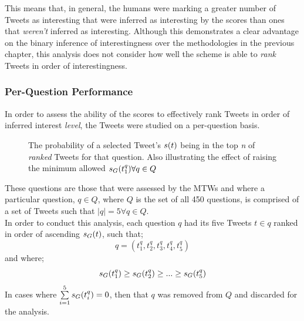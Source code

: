 This means that, in general, the humans were marking a greater number of Tweets as interesting that were inferred as interesting by the scores than ones that \textit{weren't} inferred as interesting. Although this demonstrates a clear advantage on the binary inference of interestingness over the methodologies in the previous chapter, this analysis does not consider how well the scheme is able to \textit{rank} Tweets in order of interestingness.


\subsubsection{Per-Question Performance}

In order to assess the ability of the scores to effectively rank Tweets in order of inferred interest \textit{level}, the Tweets were studied on a per-question basis.

\begin{figure}[h]
\centering
{}
\caption{The probability of a selected Tweet's $s(t)$ being in the top \textit{n} of \textit{ranked} Tweets for that question. Also illustrating the effect of raising the minimum allowed $s_G(t^q_1) \forall q \in Q$}
\label{fig:score-dist}
\end{figure}

These questions are those that were assessed by the MTWs and where a particular question, $q \in Q$, where $Q$ is the set of all 450 questions, is comprised of a set of Tweets such that $|q| = 5 \forall q \in Q$.\\
In order to conduct this analysis, each question $q$ had its five Tweets $t \in q$ ranked in order of ascending $s_G(t)$, such that;
\[
    q = (t^q_1, t^q_2, t^q_3, t^q_4, t^q_5)
\]
and where; 
\[
    s_G(t^q_1) \geq s_G(t^q_2) \geq ... \geq s_G(t^q_5)
\]
In cases where $\sum\limits_{i=1}^5 s_G(t^q_i) = 0$, then that $q$ was removed from $Q$ and discarded for the analysis.

